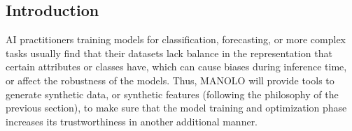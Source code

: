\subsection{Introduction}\label{subsec:2.3.data_synth_intro}



AI practitioners training models for classification, forecasting, or more complex tasks usually find that their datasets lack balance in the representation that certain attributes or classes have, which can cause biases during inference time, or affect the robustness of the models. Thus, MANOLO will provide tools to generate synthetic data, or synthetic features (following the philosophy of the previous section), to make sure that the model training and optimization phase increases its trustworthiness in another additional manner.

